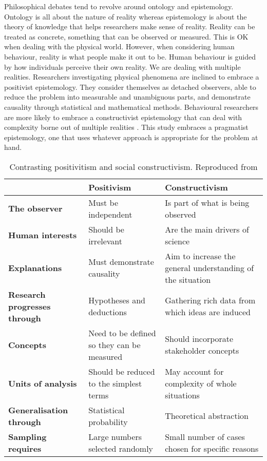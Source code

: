 
\citep{Research philosophy}

Philosophical debates tend to revolve around ontology and epistemology. Ontology is all about the nature of reality whereas epistemology is about the theory of knowledge that helps researchers make sense of reality. Reality can be treated as concrete, something that can be observed or measured. This is OK when dealing with the physical world. However, when considering human behaviour, reality is what people make it out to be. Human behaviour is guided by how individuals perceive their own reality. We are dealing with multiple realities. Researchers investigating physical phenomena are inclined to embrace a positivist epistemology. They consider themselves as detached observers, able to reduce the problem into measurable and unambiguous parts, and demonstrate causality through statistical and mathematical methods. Behavioural researchers are more likely to embrace a constructivist epistemology that can deal with complexity borne out of multiple realities \citep{easterby2015management}. This study embraces a pragmatist epistemology, one that uses whatever approach is appropriate for the problem at hand.


\begin{table}[]
	\centering
	\caption{Contrasting positivitism and social constructivism. Reproduced from \citep{easterby2015management}}
	\label{epistemology}
	\begin{tabular}{@{}lll@{}}
		\toprule
											& \textbf{Positivism}						 &\textbf{Constructivism}   \\ 
		\midrule
		\textbf{The observer}               & Must be independent                        & Is part of what is being observed                          \\
		\textbf{Human interests}            & Should be irrelevant                       & Are the main drivers of science                            \\
		\textbf{Explanations}               & Must demonstrate causality                 & Aim to increase the general understanding of the situation \\
		\textbf{Research progresses through}& Hypotheses and deductions                  & Gathering rich data from which ideas are induced           \\
		\textbf{Concepts}                   & Need to be defined so they can be measured & Should incorporate stakeholder concepts                    \\
		\textbf{Units of analysis}          & Should be reduced to the simplest terms    & May account for complexity of whole situations             \\
		\textbf{Generalisation through}     & Statistical probability                    & Theoretical abstraction                                    \\
		\textbf{Sampling requires}          & Large numbers selected randomly            & Small number of cases  chosen for specific reasons         \\ \bottomrule
	\end{tabular}
\end{table}



